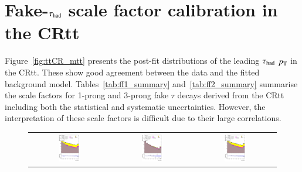 \section{Fake-$\tau_\text{had}$ scale factor calibration in the CRtt}
\label{sec:tauFF_appendix}

Figure~\ref{fig:ttCR_mtt} presents the post-fit distributions of the leading $\tau_\text{had}$ $p_{\text{T}}$ in the CRtt. These show good agreement between the data and the fitted background model.
Tables~\ref{tab:ff1_summary} and~\ref{tab:ff2_summary} summarise the scale factors for 1-prong and 3-prong fake $\tau$ decays
derived from the CRtt including both the statistical and systematic uncertainties. However, the interpretation of these scale factors is difficult due to their large correlations. 

\begin{figure}[H]
\centering
\begin{tabular}{@{}ccc@{}}
\includegraphics[page=1,width=0.29\textwidth]{figures/ttCR/tuH_reg1l1tau2b2j_os_log_ttCR.pdf} &
\includegraphics[page=1,width=0.29\textwidth]{figures/ttCR/tuH_reg1l1tau2b2j_ss_log_ttCR.pdf}&
\includegraphics[page=1,width=0.29\textwidth]{figures/ttCR/tuH_reg1l1tau2b3j_os_log_ttCR.pdf}\\

\end{tabular}
\end{figure}
